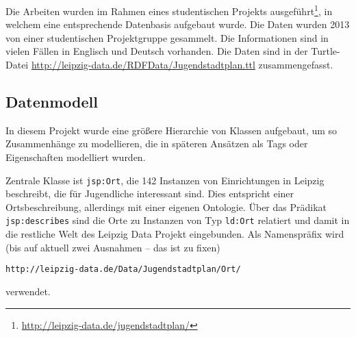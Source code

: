 \documentclass[a4paper,11pt]{article}
\begin{document}
Die Arbeiten wurden im Rahmen eines studentischen Projekts
ausgeführt\footnote{\url{http://leipzig-data.de/jugendstadtplan/}}, in welchem
eine entsprechende Datenbasis aufgebaut wurde. Die Daten wurden 2013 von einer
studentischen Projektgruppe gesammelt. Die Informationen sind in vielen Fällen
in Englisch und Deutsch vorhanden. Die Daten sind in der
Turtle-Datei \url{http://leipzig-data.de/RDFData/Jugendstadtplan.ttl}
zusammengefasst.

\subsection{Datenmodell}
In diesem Projekt wurde eine größere Hierarchie von Klassen aufgebaut, um so
Zusammenhänge zu modellieren, die in späteren Ansätzen als Tags oder
Eigenschaften modelliert wurden.

Zentrale Klasse ist \texttt{jsp:Ort}, die 142 Instanzen von Einrichtungen in
Leipzig beschreibt, die für Jugendliche interessant sind.  Dies entspricht
einer Ortsbeschreibung, allerdings mit einer eigenen Ontologie. Über das
Prädikat \texttt{jsp:describes} sind die Orte zu Instanzen von Typ
\texttt{ld:Ort} relatiert und damit in die restliche Welt des Leipzig Data
Projekt eingebunden.  Als Namenspräfix wird (bis auf aktuell zwei Ausnahmen --
das ist zu fixen) 
\begin{center}
  \texttt{http://leipzig-data.de/Data/Jugendstadtplan/Ort/}
\end{center}
verwendet.
\end{document}
